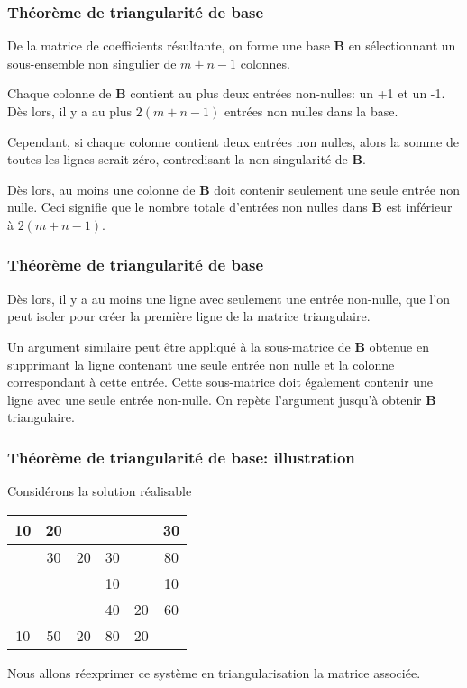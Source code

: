 \documentclass[usepdftitle=false]{beamer}
\def\bB{\boldsymbol{B}}
\begin{document}
\begin{frame}
\frametitle{Théorème de triangularité de base}

De la matrice de coefficients résultante, on forme une base $\bB$ en sélectionnant un sous-ensemble non singulier de $m+n-1$ colonnes.

\mbox{}

Chaque colonne de $\bB$ contient au plus deux entrées non-nulles: un +1 et un -1. Dès lors, il y a au plus $2(m+n-1)$ entrées non nulles dans la base. 

\mbox{}

Cependant, si chaque colonne contient deux entrées non nulles, alors la somme de toutes les lignes serait zéro, contredisant la non-singularité de $\bB$.

\mbox{}

Dès lors, au moins une colonne de $\bB$ doit contenir seulement une seule entrée non nulle. Ceci signifie que le nombre totale d'entrées non nulles dans $\bB$ est inférieur à $2(m+n-1)$.

\end{frame}

\begin{frame}
\frametitle{Théorème de triangularité de base}

Dès lors, il y a au moins une ligne avec seulement une entrée non-nulle, que l'on peut isoler pour créer la première ligne de la matrice triangulaire.

\mbox{}

Un argument similaire peut être appliqué à la sous-matrice de $\bB$ obtenue en supprimant la ligne contenant une seule entrée non nulle et la colonne correspondant à cette entrée. Cette sous-matrice doit également contenir une ligne avec une seule entrée non-nulle. On repète l'argument jusqu'à obtenir $\bB$ triangulaire.

\end{frame}

\begin{frame}
\frametitle{Théorème de triangularité de base: illustration}

Considérons la solution réalisable
\begin{center}
\begin{tabular}{|c|c|c|c|c|c}
\hline
10 & 20 & & & & 30 \\
\hline
& 30 & 20 & 30 & & 80 \\
\hline
& & & 10 & & 10 \\
\hline
& & & 40 & 20 & 60 \\
\hline
10 & 50 & 20 & 80 & 20 & \\
\end{tabular}
\end{center}

Nous allons réexprimer ce système en triangularisation la matrice associée.

\end{frame}
\end{document}
